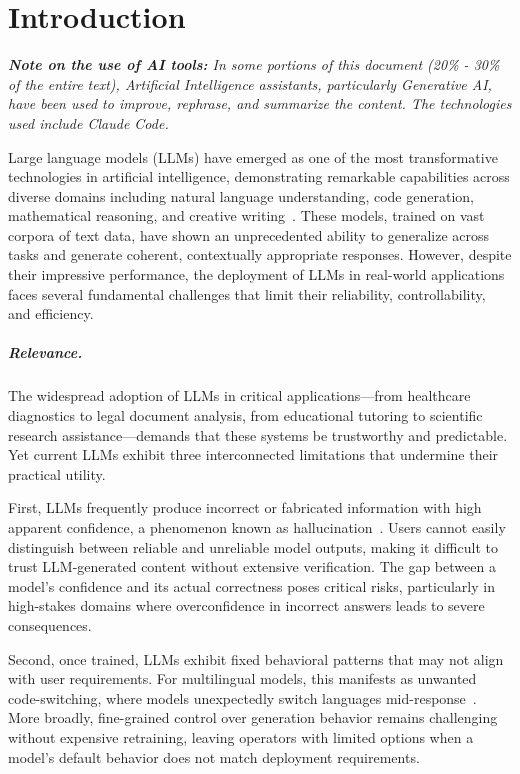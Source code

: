 \chapter{Introduction}

\noindent\textit{\textbf{Note on the use of AI tools:} In some portions of this document (20\% - 30\% of the entire text), Artificial Intelligence assistants, particularly Generative AI, have been used to improve, rephrase, and summarize the content. The technologies used include Claude Code.}

\bigskip

Large language models (LLMs) have emerged as one of the most transformative technologies in artificial intelligence, demonstrating remarkable capabilities across diverse domains including natural language understanding, code generation, mathematical reasoning, and creative writing~\cite{brown2020language,openai2023gpt4,touvron2023llama}. These models, trained on vast corpora of text data, have shown an unprecedented ability to generalize across tasks and generate coherent, contextually appropriate responses. However, despite their impressive performance, the deployment of LLMs in real-world applications faces several fundamental challenges that limit their reliability, controllability, and efficiency.

\paragraph{Relevance.}
The widespread adoption of LLMs in critical applications---from healthcare diagnostics to legal document analysis, from educational tutoring to scientific research assistance---demands that these systems be trustworthy and predictable. Yet current LLMs exhibit three interconnected limitations that undermine their practical utility.

First, LLMs frequently produce incorrect or fabricated information with high apparent confidence, a phenomenon known as hallucination~\cite{ji2023survey}. Users cannot easily distinguish between reliable and unreliable model outputs, making it difficult to trust LLM-generated content without extensive verification. The gap between a model's confidence and its actual correctness poses critical risks, particularly in high-stakes domains where overconfidence in incorrect answers leads to severe consequences.

Second, once trained, LLMs exhibit fixed behavioral patterns that may not align with user requirements. For multilingual models, this manifests as unwanted code-switching, where models unexpectedly switch languages mid-response~\cite{winata2021language}. More broadly, fine-grained control over generation behavior remains challenging without expensive retraining, leaving operators with limited options when a model's default behavior does not match deployment requirements.

